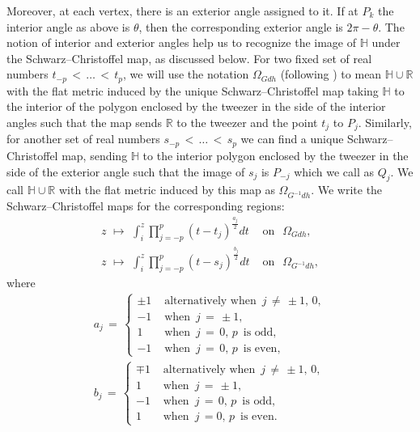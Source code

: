 \documentclass[12pt,epsfig,tikz,multi]{amsart}
\numberwithin{equation}{section}
\def \R {{\mathbb {R}}}
\def \H {{\mathbb {H}}}
\begin{document}
Moreover, at each vertex, there is an exterior angle assigned to it. If at $P_k$ the interior angle as above 
is $\theta$, then the corresponding exterior angle is $2\pi-\theta$. The notion of interior and exterior 
angles help us to recognize the image of $\H$ under the Schwarz--Christoffel map, as discussed below. For two 
fixed set of real numbers $t_{-p}\,<\, \ldots\,<\,t_p$, we will use the notation $\Omega_{Gdh}$ (following 
\cite{Weber1998TeichmullerTA}) to mean $\H\cup\R$ with the flat metric induced by the unique Schwarz--Christoffel 
map taking $\H$ to the interior of the polygon enclosed by the tweezer in the side of the interior angles 
such that the map sends $\R$ to the tweezer and the point $t_j$ to $P_j$. Similarly,  for another set of real numbers $s_{-p}\,<\,\ldots\,<\,s_p$ we can find a unique 
Schwarz--Christoffel map, sending $\H$ to the interior polygon enclosed by the tweezer in the side of the 
exterior angle such that the image of $s_j$ is $P_{-j}$ which we call as $Q_j$.  We call $\H\cup\R$ with the flat metric induced by 
this map as $\Omega_{G^{-1}dh}$. We write the Schwarz--Christoffel maps for the corresponding regions:
\begin{eqnarray*}
    z\,\,\longmapsto\,\,
    \int_{ i }^z \prod_{j=-p}^p (t-t_j)^{\frac{a_j}{2}}dt & \text{ on }\ \, \Omega_{Gdh},\\
    z\,\,\longmapsto\,\,
    \int_{ i }^z \prod_{j=-p}^p (t-s_j)^{\frac{b_j}{2}}dt & \text{ on }\ \, \Omega_{G^{-1}dh},
\end{eqnarray*}
where
\begin{eqnarray*}
    a_j\,=\,\begin{cases}
    \pm 1 & \text{ alternatively when }\, j \,\neq\, \pm 1,\,0,\\
    -1 & \text{ when }\, j\,=\,\pm 1,\\
    1  & \text{ when }\, j\,=\,0,\,p\, \text{ is odd},\\
    -1  & \text{ when }\, j\,=\,0,\,p\, \text{ is even},
\end{cases}\\
b_j\,=\,\begin{cases}
    \mp 1 & \text{ alternatively when }\, j \,\neq\, \pm 1,\,0,\\
    1 & \text{ when }\, j\,=\,\pm 1,\\
    -1  & \text{ when }\, j\,=\,0,\,p\, \text{ is odd},\\
    1  & \text{ when }\, j\,=0,\,p\, \text{ is even}.
\end{cases}
\end{eqnarray*}
\end{document}
